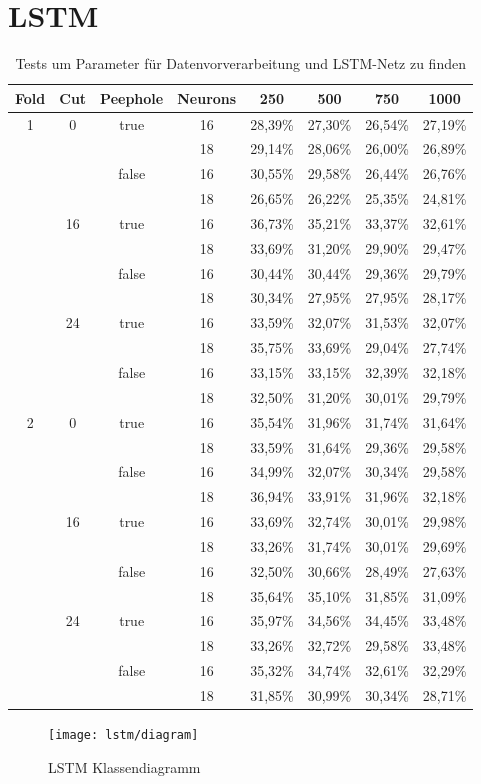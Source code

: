\section{\acs{LSTM}}
\begin{table*}[htbp]
\centering
\begin{tabular}{|c|c|c|c|c|c|c|c|}
\hline
 Fold 		& Cut & Peephole & Neurons & 250 & 500 & 750 & 1000 \\
 \hline
 \multirow{12}{*}{1}&\multirow{4}{*}{0}&\multirow{2}{*}{true}&16&28,39\%&27,30\%&26,54\%&27,19\%\\
  & & &18&29,14\%&28,06\%&26,00\%&26,89\%\\
  & &\multirow{2}{*}{false}&16&30,55\%&29,58\%&26,44\%&26,76\%\\
  & & &18&26,65\%&26,22\%&25,35\%&24,81\%\\
  \hline
  &\multirow{4}{*}{16}&\multirow{2}{*}{true}&16&36,73\%&35,21\%&33,37\%&32,61\%\\
  & & &18&33,69\%&31,20\%&29,90\%&29,47\%\\
  & &\multirow{2}{*}{false}&16&30,44\%&30,44\%&29,36\%&29,79\%\\
  & & &18&30,34\%&27,95\%&27,95\%&28,17\%\\
  \hline
  &\multirow{4}{*}{24}&\multirow{2}{*}{true}&16&33,59\%&32,07\%&31,53\%&32,07\%\\
  & & &18&35,75\%&33,69\%&29,04\%&27,74\%\\
  & &\multirow{2}{*}{false}&16&33,15\%&33,15\%&32,39\%&32,18\%\\
  & & &18&32,50\%&31,20\%&30,01\%&29,79\%\\
  \hline
  \multirow{12}{*}{2}&\multirow{4}{*}{0}&\multirow{2}{*}{true}&16&35,54\%&31,96\%&31,74\%&31,64\%\\
  & & &18&33,59\%&31,64\%&29,36\%&29,58\%\\
  & &\multirow{2}{*}{false}&16&34,99\%&32,07\%&30,34\%&29,58\%\\
  & & &18&36,94\%&33,91\%&31,96\%&32,18\%\\
  \hline
  &\multirow{4}{*}{16}&\multirow{2}{*}{true}&16&33,69\%&32,74\%&30,01\%&29,98\%\\
  & & &18&33,26\%&31,74\%&30,01\%&29,69\%\\
  & &\multirow{2}{*}{false}&16&32,50\%&30,66\%&28,49\%&27,63\%\\
  & & &18&35,64\%&35,10\%&31,85\%&31,09\%\\
  \hline
  &\multirow{4}{*}{24}&\multirow{2}{*}{true}&16&35,97\%&34,56\%&34,45\%&33,48\%\\
  & & &18&33,26\%&32,72\%&29,58\%&33,48\%\\
  & &\multirow{2}{*}{false}&16&35,32\%&34,74\%&32,61\%&32,29\%\\
  & & &18&31,85\%&30,99\%&30,34\%&28,71\%\\
\hline
\end{tabular} 
\caption[Tests für Daten und LSTM-Netz]{Tests um Parameter für Datenvorverarbeitung und LSTM-Netz zu finden}
\label{tab:inputtests}
\end{table*}

\begin{figure*}[htfp]
  \begin{center}
  \texttt{[image: lstm/diagram]}
  \caption[\acs{LSTM} Klassendiagramm]{\acs{LSTM} Klassendiagramm}
  \label{fig:lstm_class}
  \end{center}
\end{figure*}  